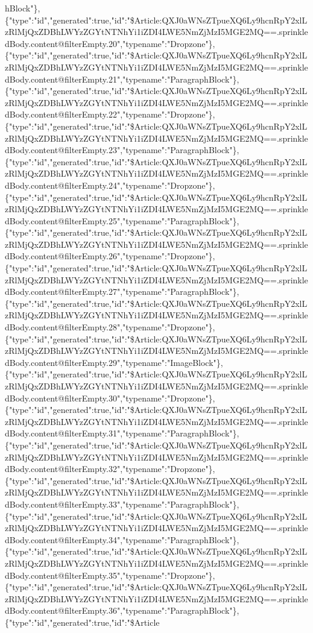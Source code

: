 hBlock"\},\{"type":"id","generated":true,"id":"\$Article:QXJ0aWNsZTpueXQ6Ly9hcnRpY2xlLzRlMjQxZDBhLWYzZGYtNTNhYi1iZDI4LWE5NmZjMzI5MGE2MQ==.sprinkledBody.content@filterEmpty.20","typename":"Dropzone"\},\{"type":"id","generated":true,"id":"\$Article:QXJ0aWNsZTpueXQ6Ly9hcnRpY2xlLzRlMjQxZDBhLWYzZGYtNTNhYi1iZDI4LWE5NmZjMzI5MGE2MQ==.sprinkledBody.content@filterEmpty.21","typename":"ParagraphBlock"\},\{"type":"id","generated":true,"id":"\$Article:QXJ0aWNsZTpueXQ6Ly9hcnRpY2xlLzRlMjQxZDBhLWYzZGYtNTNhYi1iZDI4LWE5NmZjMzI5MGE2MQ==.sprinkledBody.content@filterEmpty.22","typename":"Dropzone"\},\{"type":"id","generated":true,"id":"\$Article:QXJ0aWNsZTpueXQ6Ly9hcnRpY2xlLzRlMjQxZDBhLWYzZGYtNTNhYi1iZDI4LWE5NmZjMzI5MGE2MQ==.sprinkledBody.content@filterEmpty.23","typename":"ParagraphBlock"\},\{"type":"id","generated":true,"id":"\$Article:QXJ0aWNsZTpueXQ6Ly9hcnRpY2xlLzRlMjQxZDBhLWYzZGYtNTNhYi1iZDI4LWE5NmZjMzI5MGE2MQ==.sprinkledBody.content@filterEmpty.24","typename":"Dropzone"\},\{"type":"id","generated":true,"id":"\$Article:QXJ0aWNsZTpueXQ6Ly9hcnRpY2xlLzRlMjQxZDBhLWYzZGYtNTNhYi1iZDI4LWE5NmZjMzI5MGE2MQ==.sprinkledBody.content@filterEmpty.25","typename":"ParagraphBlock"\},\{"type":"id","generated":true,"id":"\$Article:QXJ0aWNsZTpueXQ6Ly9hcnRpY2xlLzRlMjQxZDBhLWYzZGYtNTNhYi1iZDI4LWE5NmZjMzI5MGE2MQ==.sprinkledBody.content@filterEmpty.26","typename":"Dropzone"\},\{"type":"id","generated":true,"id":"\$Article:QXJ0aWNsZTpueXQ6Ly9hcnRpY2xlLzRlMjQxZDBhLWYzZGYtNTNhYi1iZDI4LWE5NmZjMzI5MGE2MQ==.sprinkledBody.content@filterEmpty.27","typename":"ParagraphBlock"\},\{"type":"id","generated":true,"id":"\$Article:QXJ0aWNsZTpueXQ6Ly9hcnRpY2xlLzRlMjQxZDBhLWYzZGYtNTNhYi1iZDI4LWE5NmZjMzI5MGE2MQ==.sprinkledBody.content@filterEmpty.28","typename":"Dropzone"\},\{"type":"id","generated":true,"id":"\$Article:QXJ0aWNsZTpueXQ6Ly9hcnRpY2xlLzRlMjQxZDBhLWYzZGYtNTNhYi1iZDI4LWE5NmZjMzI5MGE2MQ==.sprinkledBody.content@filterEmpty.29","typename":"ImageBlock"\},\{"type":"id","generated":true,"id":"\$Article:QXJ0aWNsZTpueXQ6Ly9hcnRpY2xlLzRlMjQxZDBhLWYzZGYtNTNhYi1iZDI4LWE5NmZjMzI5MGE2MQ==.sprinkledBody.content@filterEmpty.30","typename":"Dropzone"\},\{"type":"id","generated":true,"id":"\$Article:QXJ0aWNsZTpueXQ6Ly9hcnRpY2xlLzRlMjQxZDBhLWYzZGYtNTNhYi1iZDI4LWE5NmZjMzI5MGE2MQ==.sprinkledBody.content@filterEmpty.31","typename":"ParagraphBlock"\},\{"type":"id","generated":true,"id":"\$Article:QXJ0aWNsZTpueXQ6Ly9hcnRpY2xlLzRlMjQxZDBhLWYzZGYtNTNhYi1iZDI4LWE5NmZjMzI5MGE2MQ==.sprinkledBody.content@filterEmpty.32","typename":"Dropzone"\},\{"type":"id","generated":true,"id":"\$Article:QXJ0aWNsZTpueXQ6Ly9hcnRpY2xlLzRlMjQxZDBhLWYzZGYtNTNhYi1iZDI4LWE5NmZjMzI5MGE2MQ==.sprinkledBody.content@filterEmpty.33","typename":"ParagraphBlock"\},\{"type":"id","generated":true,"id":"\$Article:QXJ0aWNsZTpueXQ6Ly9hcnRpY2xlLzRlMjQxZDBhLWYzZGYtNTNhYi1iZDI4LWE5NmZjMzI5MGE2MQ==.sprinkledBody.content@filterEmpty.34","typename":"ParagraphBlock"\},\{"type":"id","generated":true,"id":"\$Article:QXJ0aWNsZTpueXQ6Ly9hcnRpY2xlLzRlMjQxZDBhLWYzZGYtNTNhYi1iZDI4LWE5NmZjMzI5MGE2MQ==.sprinkledBody.content@filterEmpty.35","typename":"Dropzone"\},\{"type":"id","generated":true,"id":"\$Article:QXJ0aWNsZTpueXQ6Ly9hcnRpY2xlLzRlMjQxZDBhLWYzZGYtNTNhYi1iZDI4LWE5NmZjMzI5MGE2MQ==.sprinkledBody.content@filterEmpty.36","typename":"ParagraphBlock"\},\{"type":"id","generated":true,"id":"\$Article